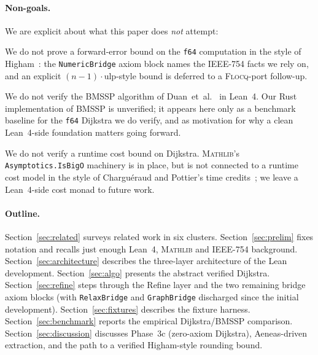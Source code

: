 \documentclass[11pt,a4paper]{article}
\makeatletter
\providecommand{\Cref}[1]{Section~\ref{#1}}
\let\enitfb@itemize\itemize
\let\enitfb@enditemize\enditemize
\renewenvironment{itemize}[1][]{\enitfb@itemize}{\enitfb@enditemize}%
\newcommand{\Lean}{Lean~4\xspace}
\newcommand{\Mathlib}{\textsc{Mathlib}\xspace}
\newcommand{\BMSSP}{\textsc{BMSSP}\xspace}
\newcommand{\Dijkstra}{Dijkstra\xspace}
\newcommand{\code}[1]{\texttt{#1}}
\theoremstyle{plain}
\theoremstyle{definition}
\makeatother
\begin{document}
\paragraph*{Non-goals.}
We are explicit about what this paper does \emph{not} attempt:
\begin{itemize}[leftmargin=1.6em,itemsep=0.25em]
\item We do not prove a forward-error bound on the \code{f64}
      computation in the style of
      Higham~\cite{Higham2002Accuracy}: the \code{NumericBridge} axiom
      block names the IEEE-754 facts we rely on, and an explicit
      $(n-1)\cdot\mathrm{ulp}$-style bound is deferred to a
      \textsc{Flocq}-port follow-up.
\item We do not verify the \BMSSP{} algorithm of
      Duan~et~al.~\cite{DuanMaoMaoShuYin2025} in \Lean. Our Rust
      implementation of \BMSSP{} is unverified; it appears here only as a
      benchmark baseline for the \code{f64} \Dijkstra{} we do verify, and as
      motivation for why a clean \Lean{}-side foundation matters going
      forward.
\item We do not verify a runtime cost bound on \Dijkstra{}. \Mathlib's
      \code{Asymptotics.IsBigO} machinery is in place, but is not connected
      to a runtime cost model in the style of Charguéraud and Pottier's
      time credits~\cite{CharguraudPottier2015UnionFind,GueneauChargueraudPottier2018ESOP};
      we leave a \Lean-side cost monad to future work.
\end{itemize}

\paragraph*{Outline.}
\Cref{sec:related} surveys related work in six clusters. \Cref{sec:prelim}
fixes notation and recalls just enough \Lean, \Mathlib{} and IEEE-754
background. \Cref{sec:architecture} describes the three-layer architecture
of the Lean development. \Cref{sec:algo} presents the abstract verified
\Dijkstra. \Cref{sec:refine} steps through the Refine layer and the
two remaining bridge axiom blocks (with \code{RelaxBridge} and
\code{GraphBridge} discharged since the initial development).
\Cref{sec:fixtures} describes the fixture harness.
\Cref{sec:benchmark} reports the empirical \Dijkstra/\BMSSP{} comparison.
\Cref{sec:discussion} discusses Phase~3c (zero-axiom \Dijkstra),
Aeneas-driven extraction, and the path to a verified Higham-style rounding
bound.

\end{document}
